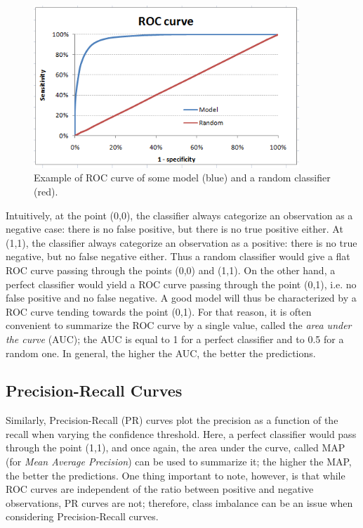 \documentclass[11pt]{report}
\begin{document}
\begin{figure}[h!]
\centering\includegraphics[width=10cm]{ROCexemple.png}
\caption{Example of ROC curve of some model (blue) and a random classifier (red).}
\label{ROCexemple}
\end{figure}

Intuitively, at the point (0,0), the classifier always categorize an observation as a negative case: there is no false positive, but there is no true positive either. At (1,1), the classifier always categorize an observation as a positive: there is no true negative, but no false negative either. Thus a random classifier would give a flat ROC curve passing through the points (0,0) and (1,1).\newline
On the other hand, a perfect classifier would yield a ROC curve passing through the point (0,1), i.e. no false positive and no false negative. A good model will thus be characterized by a ROC curve tending towards the point (0,1). For that reason, it is often convenient to summarize the ROC curve by a single value, called the \emph{area under the curve} (AUC); the AUC is equal to 1 for a perfect classifier and to 0.5 for a random one. In general, the higher the AUC, the better the predictions.\newline

\subsection{Precision-Recall Curves}

Similarly, Precision-Recall (PR) curves plot the precision as a function of the recall when varying the confidence threshold. Here, a perfect classifier would pass through the point (1,1), and once again, the area under the curve, called MAP (for \emph{Mean Average Precision}) can be used to summarize it; the higher the MAP, the better the predictions. One thing important to note, however, is that while ROC curves are independent of the ratio between positive and negative observations, PR curves are not; therefore, class imbalance can be an issue when considering Precision-Recall curves.\newline
\end{document}

